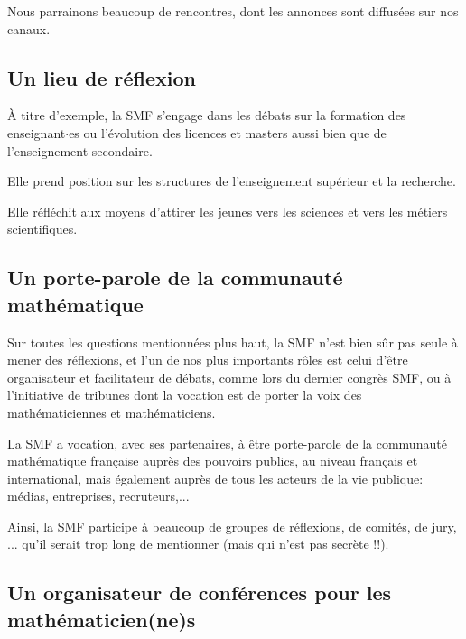Nous parrainons beaucoup de rencontres, dont les annonces sont diffus\'ees sur nos canaux.

\subsection{Un lieu de r\'{e}flexion} 
\`{A} titre  d'exemple, la SMF s'engage dans les d\'ebats sur la formation des enseignant$\cdot$es ou l'\'{e}volution des licences et masters aussi bien que de l'enseignement secondaire.

Elle prend position sur les structures de l'enseignement sup\'{e}rieur et la recherche.

Elle r\'{e}fl\'{e}chit aux moyens d'attirer les jeunes vers les sciences et vers les m\'{e}tiers scientifiques.  


\subsection{Un porte-parole de la communaut\'{e} math\'{e}matique}
Sur toutes les questions mentionn\'ees plus haut, la SMF n'est bien s\^ur pas  seule \`a mener des r\'eflexions, et l'un de nos plus importants  r\^oles est celui d'\^etre organisateur  et facilitateur de d\'ebats, comme lors du dernier congr\`es SMF, ou \`a l'initiative de tribunes dont la vocation est de porter la voix des math\'ematiciennes et math\'ematiciens.

 La SMF a vocation, avec ses partenaires, \`{a} \^{e}tre porte-parole de la communaut\'{e} math\'{e}matique fran\c{c}aise aupr\`{e}s des pouvoirs publics, au niveau fran\c cais et international, mais \'egalement aupr\`es de tous les acteurs de la vie publique: m\'edias, entreprises, recruteurs,...

Ainsi, la SMF participe \`a beaucoup de groupes de r\'eflexions, de comit\'es, de jury, ... qu'il serait trop long de mentionner (mais qui n'est pas secr\`ete !!).

\subsection{Un organisateur de   conf\'erences pour les math\'ematicien(ne)s} 

